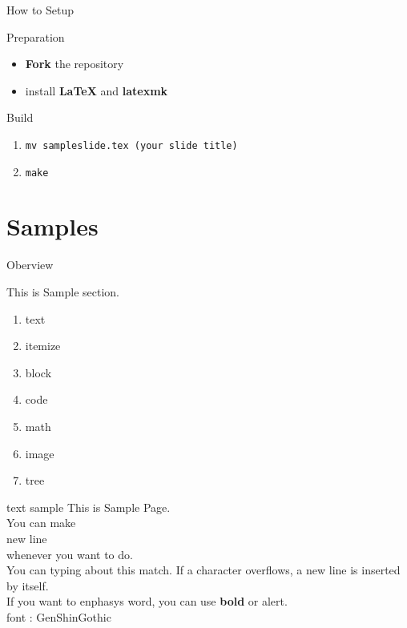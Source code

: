 \documentclass[aspectratio=1610,14pt]{beamer}
\begin{document}
\begin{frame}{How to Setup}
    \begin{textblock}{Preparation}
        \begin{itemize}
            \item{\textbf{Fork} the repository}
            \item{install \textbf{LaTeX} and \textbf{latexmk}}
        \end{itemize}
    \end{textblock}

    \begin{textblock}{Build}
        \begin{enumerate}
            \item{\lstinline|mv sampleslide.tex (your slide title)|}
            \item{\lstinline|make|}
        \end{enumerate}
    \end{textblock}
\end{frame}

\section{Samples}
\begin{frame}
    \tableofcontents[currentsection]
\end{frame}

\begin{frame}{Oberview}
    \begin{textblock}{This is Sample section.}
        \begin{enumerate}
            \item{text}
            \item{itemize}
            \item{block}
            \item{code}
            \item{math}
            \item{image} 
            \item{tree}
        \end{enumerate}
    \end{textblock}
\end{frame}

\begin{frame}{text sample}
    This is Sample Page.\\
    You can make \\
    \alert{new line}\\
    whenever you want to do.\\
    You can typing about this match. If a character overflows, a new line is inserted by itself.\\
    If you want to enphasys word, you can use \textbf{bold} or \alert{alert}. \\
    font : GenShinGothic
\end{frame}
\end{document}
